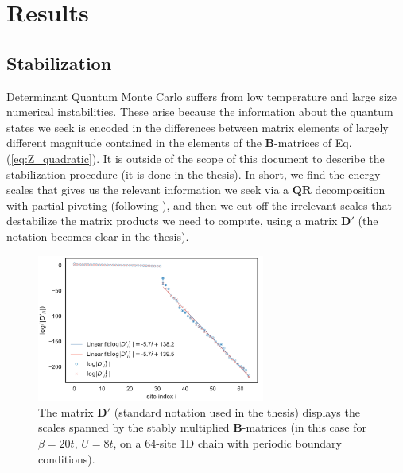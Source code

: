 
\section{Results}
\label{sec:imple}
\vspace{0.2cm}
\subsection{Stabilization}
Determinant Quantum Monte Carlo suffers from low temperature and large size numerical instabilities.
These arise because the information about the quantum states we seek is encoded in the differences between matrix elements of largely different magnitude contained in the elements of the $\bm B$-matrices of Eq.(\ref{eq:Z_quadratic}).
It is outside of the scope of this document to describe the stabilization procedure (it is done in the thesis).
In short, we find the energy scales that gives us the relevant information we seek via a $\bm Q \bm R$ decomposition with partial pivoting (following \cite{bai_stable_2011}), and then we cut off the irrelevant scales that destabilize the matrix products we need to compute, using a matrix $\bm D'$ (the notation becomes clear in the thesis).
\begin{figure}[H]
  \centering
  \includegraphics[width =7.5cm]{images/OrdersOfMagnitude_N=64sites.png}
  \caption{The matrix $\bm D'$ (standard notation used in the thesis) displays the scales spanned by the stably multiplied $\bm B$-matrices (in this case for $\beta = 20t$, $U = 8t$, on a 64-site 1D chain with periodic boundary conditions).}
  \label{fig:numerical_scales}
\end{figure}

